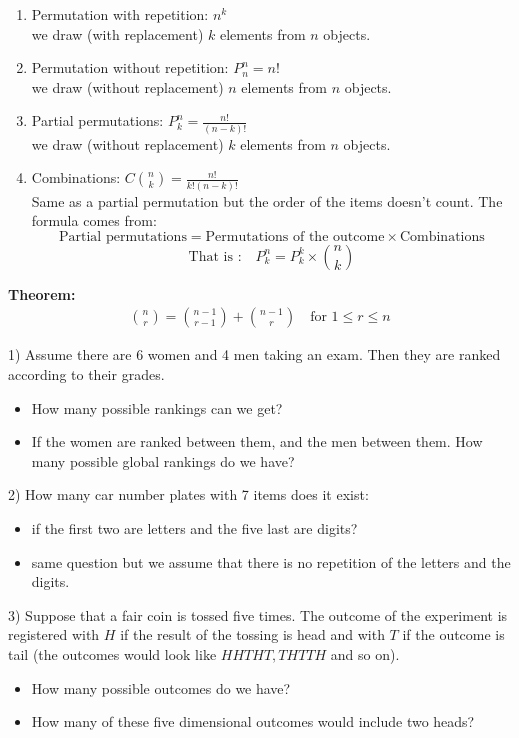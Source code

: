 \documentclass[12pt,a4paper,titlepage]{article}\usepackage[]{graphicx}\usepackage[]{color}
\begin{document}
\begin{enumerate}
  \item Permutation with repetition: $n^k$  \\
  we draw (with replacement) $k$ elements from $n$ objects.
  \item Permutation without repetition: $P^n_n=n!$ \\
  we draw (without replacement) $n$ elements from $n$ objects.
  \item Partial permutations: $P^n_k=\frac{n!}{(n-k)!}$ \\
  we draw (without replacement) $k$ elements from $n$ objects.
  \item Combinations: $C{n \choose k}=\frac{n!}{k!(n-k)!}$ \\
  Same as a partial permutation but the order of the items doesn't count.
  The formula comes from:
  $$ \text{Partial permutations}= \text{Permutations of the outcome} \times \text{Combinations}$$
$$ \text{That is :} \quad P^n_k=P^k_k \times {n \choose k} $$
\end{enumerate}

\textbf{Theorem:}
\begin{align}
{n \choose r}={n-1 \choose r-1}+{n-1 \choose r} \quad \text{for } 1\leq r\leq n
\end{align}

\vspace{1cm}

1) Assume there are 6 women and 4 men taking an exam. Then they are ranked according to their grades.
\begin{itemize}
  \item How many possible rankings can we get?
  \item If the women are ranked between them, and the men between them. How many possible global rankings do we have?
\end{itemize}

2) How many car number plates with 7 items does it exist:
\begin{itemize}
  \item if the first two are letters and the five last are digits?
  \item same question but we assume that there is no repetition of the letters and the digits.
\end{itemize}

3) Suppose that a fair coin is tossed five times. The outcome of the experiment is registered with $ H $ if the result of the tossing is head and with $ T $ if the outcome is tail (the outcomes would look like $ HHTHT, THTTH $ and so on).
\begin{itemize}
  \item How many possible outcomes do we have?
  \item How many of these five dimensional outcomes would include two heads?
\end{itemize}
\end{document}
